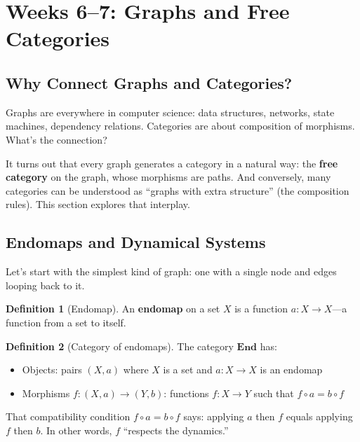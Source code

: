 \documentclass[11pt]{article}
\newcommand{\cat}[1]{\mathbf{#1}}
\theoremstyle{definition}
\newtheorem{definition}{Definition}[section]
\theoremstyle{plain}
\theoremstyle{remark}
\begin{document}
\section{Weeks 6--7: Graphs and Free Categories}

\subsection*{Why Connect Graphs and Categories?}

Graphs are everywhere in computer science: data structures, networks, state machines, dependency relations. Categories are about composition of morphisms. What's the connection?

It turns out that every graph generates a category in a natural way: the \textbf{free category} on the graph, whose morphisms are paths. And conversely, many categories can be understood as ``graphs with extra structure'' (the composition rules). This section explores that interplay.

\subsection{Endomaps and Dynamical Systems}

Let's start with the simplest kind of graph: one with a single node and edges looping back to it.

\begin{definition}[Endomap]
An \textbf{endomap} on a set $X$ is a function $a: X \to X$---a function from a set to itself.
\end{definition}

\begin{definition}[Category of endomaps]
The category $\cat{End}$ has:
\begin{itemize}
  \item Objects: pairs $(X, a)$ where $X$ is a set and $a: X \to X$ is an endomap
  \item Morphisms $f: (X, a) \to (Y, b)$: functions $f: X \to Y$ such that $f \circ a = b \circ f$
\end{itemize}
\end{definition}

That compatibility condition $f \circ a = b \circ f$ says: applying $a$ then $f$ equals applying $f$ then $b$. In other words, $f$ ``respects the dynamics.''
\end{document}
